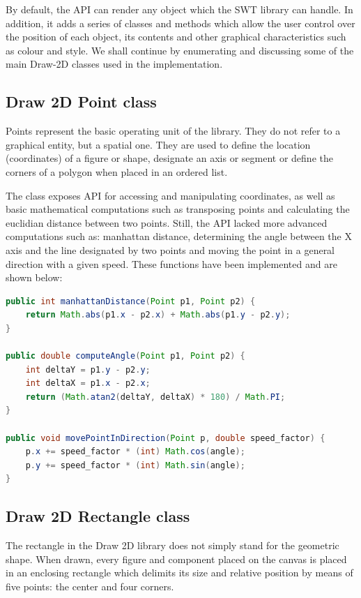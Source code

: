 By default, the API can render any object which the SWT library can handle. In addition, it adds a series of 
classes and methods which allow the user control over the position of each object, its contents and other 
graphical characteristics such as colour and style. We shall continue by enumerating and discussing some of 
the main Draw-2D classes used in the implementation.

\subsection{Draw 2D Point class}

Points represent the basic operating unit of the library. They do not refer to a graphical entity, but a 
spatial one. They are used to define the location (coordinates) of a figure or shape, designate an axis 
or segment or define the corners of a polygon when placed in an ordered list.

The class exposes API for accessing and manipulating coordinates, as well as basic mathematical computations 
such as transposing points and calculating the euclidian distance between two points. Still, the API lacked more 
advanced computations such as: manhattan distance, determining the angle between the X axis and the line 
designated by two points and moving the point in a general direction with a given speed. These functions 
have been implemented and are shown below:

\begin{lstlisting}[caption={Functions added for the Point class}, language=Java]
public int manhattanDistance(Point p1, Point p2) {
	return Math.abs(p1.x - p2.x) + Math.abs(p1.y - p2.y);
} 

public double computeAngle(Point p1, Point p2) {
	int deltaY = p1.y - p2.y;
	int deltaX = p1.x - p2.x;
	return (Math.atan2(deltaY, deltaX) * 180) / Math.PI;
}

public void movePointInDirection(Point p, double speed_factor) {
	p.x += speed_factor * (int) Math.cos(angle);
	p.y += speed_factor * (int) Math.sin(angle);
}

\end{lstlisting}

\subsection{Draw 2D Rectangle class}

The rectangle in the Draw 2D library does not simply stand for the geometric shape. When drawn, every 
figure and component placed on the canvas is placed in an enclosing rectangle which delimits its size 
and relative position by means of five points: the center and four corners. 


